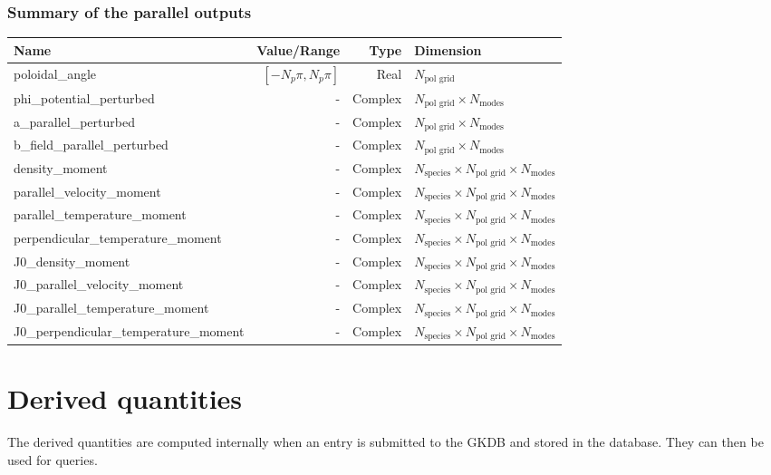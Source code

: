\documentclass[fleqn]{report}
\begin{document}
\subsection{Summary of the parallel outputs}
\begin{tabularx}{\textwidth}{|L|R|R|Y|}
\hline
Name & Value/Range & Type & Dimension \\
\hline
poloidal\_angle & $[-N_p\pi,N_p\pi]$ & Real & $N_\textrm{pol grid}$\\
phi\_potential\_perturbed & - & Complex & $N_\textrm{pol grid}\times N_\textrm{modes}$\\
a\_parallel\_perturbed & - & Complex & $N_\textrm{pol grid}\times N_\textrm{modes}$\\
b\_field\_parallel\_perturbed & - & Complex & $N_\textrm{pol grid}\times N_\textrm{modes}$\\ 
density\_moment & - & Complex & $N_\textrm{species}\times N_\textrm{pol grid}\times N_\textrm{modes}$\\
parallel\_velocity\_moment & - & Complex & $N_\textrm{species}\times N_\textrm{pol grid}\times N_\textrm{modes}$\\
parallel\_temperature\_moment & - & Complex & $N_\textrm{species}\times N_\textrm{pol grid}\times N_\textrm{modes}$\\
perpendicular\_temperature\_moment & - & Complex & $N_\textrm{species}\times N_\textrm{pol grid}\times N_\textrm{modes}$\\
J0\_density\_moment & - & Complex & $N_\textrm{species}\times N_\textrm{pol grid}\times N_\textrm{modes}$\\
J0\_parallel\_velocity\_moment & - & Complex & $N_\textrm{species}\times N_\textrm{pol grid}\times N_\textrm{modes}$\\
J0\_parallel\_temperature\_moment & - & Complex & $N_\textrm{species}\times N_\textrm{pol grid}\times N_\textrm{modes}$\\
J0\_perpendicular\_temperature\_moment & - & Complex & $N_\textrm{species}\times N_\textrm{pol grid}\times N_\textrm{modes}$\\
\hline
\end{tabularx}

\chapter{Derived quantities}
The derived quantities are computed internally when an entry is submitted to the GKDB and stored in the database. They can then be used for queries. 
\end{document}
